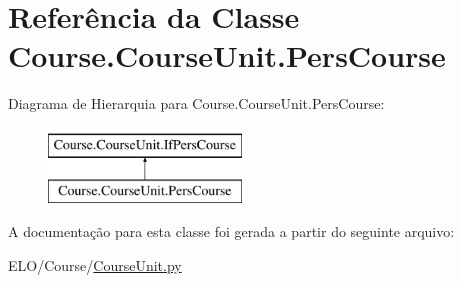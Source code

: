 \hypertarget{classCourse_1_1CourseUnit_1_1PersCourse}{\section{Referência da Classe Course.\-Course\-Unit.\-Pers\-Course}
\label{classCourse_1_1CourseUnit_1_1PersCourse}
}
Diagrama de Hierarquia para Course.\-Course\-Unit.\-Pers\-Course\-:\begin{figure}[H]
\begin{center}
\leavevmode
\includegraphics[height=2.000000cm]{d1/d75/classCourse_1_1CourseUnit_1_1PersCourse}
\end{center}
\end{figure}


A documentação para esta classe foi gerada a partir do seguinte arquivo\-:\begin{DoxyCompactItemize}
\item 
E\-L\-O/\-Course/\hyperlink{CourseUnit_8py}{Course\-Unit.\-py}\end{DoxyCompactItemize}
